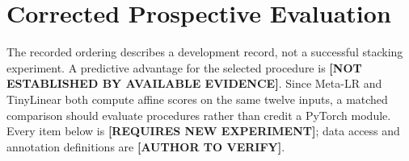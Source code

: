 \documentclass[runningheads]{llncs}
\newcommand{\needexp}{\textbf{[REQUIRES NEW EXPERIMENT]}}
\newcommand{\verifyauthor}{\textbf{[AUTHOR TO VERIFY]}}
\newcommand{\notestablished}{\textbf{[NOT ESTABLISHED BY AVAILABLE EVIDENCE]}}
\begin{document}


\section{Corrected Prospective Evaluation}
\label{sec:discussion}

The recorded ordering describes a development record, not a successful stacking experiment. A predictive advantage for the selected procedure is \notestablished{}. Since Meta-LR and TinyLinear both compute affine scores on the same twelve inputs, a matched comparison should evaluate procedures rather than credit a PyTorch module. Every item below is \needexp{}; data access and annotation definitions are \verifyauthor{}.
\end{document}

